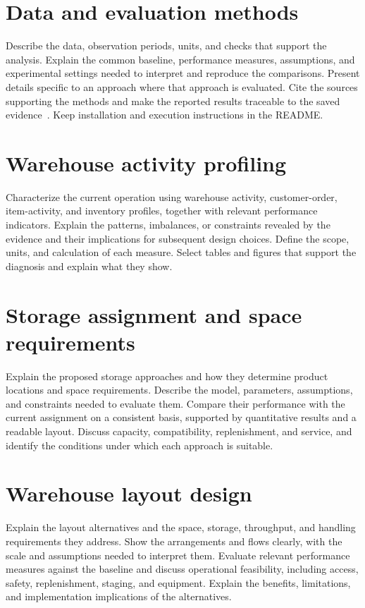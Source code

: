\documentclass[conference]{IEEEtran}
\begin{document}
\section{Data and evaluation methods}
Describe the data, observation periods, units, and checks that support the
analysis. Explain the common baseline, performance measures, assumptions,
and experimental settings needed to interpret and reproduce the comparisons.
Present details specific to an approach where that approach is evaluated.
Cite the sources supporting the methods and make the reported results
traceable to the saved evidence~\cite{turingway}. Keep installation and
execution instructions in the README.

\section{Warehouse activity profiling}
Characterize the current operation using warehouse activity, customer-order,
item-activity, and inventory profiles, together with relevant performance
indicators. Explain the patterns, imbalances, or constraints revealed by the
evidence and their implications for subsequent design choices. Define the
scope, units, and calculation of each measure. Select tables and figures
that support the diagnosis and explain what they show.

\section{Storage assignment and space requirements}
Explain the proposed storage approaches and how they determine product
locations and space requirements. Describe the model, parameters, assumptions,
and constraints needed to evaluate them. Compare their performance with the
current assignment on a consistent basis, supported by quantitative results
and a readable layout. Discuss capacity, compatibility, replenishment, and
service, and identify the conditions under which each approach is suitable.

\section{Warehouse layout design}
Explain the layout alternatives and the space, storage, throughput, and
handling requirements they address. Show the arrangements and flows clearly,
with the scale and assumptions needed to interpret them. Evaluate relevant
performance measures against the baseline and discuss operational feasibility,
including access, safety, replenishment, staging, and equipment. Explain the
benefits, limitations, and implementation implications of the alternatives.
\end{document}
